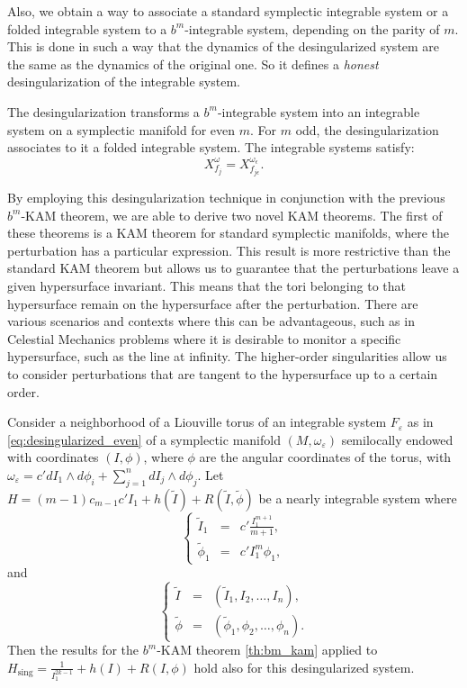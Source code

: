 Also, we obtain a way to associate a standard symplectic integrable system or a folded integrable system to a $b^m$-integrable system, depending on the parity of $m$. This is done in such a way that the dynamics of the desingularized system are the same as the dynamics of the original one. So it defines a \emph{honest} desingularization of the integrable system.

\begin{theoremC}
The desingularization transforms a $b^m$-integrable system into an integrable system  on a symplectic manifold for even $m$. For $m$ odd, the desingularization associates to it  a folded integrable system. The integrable systems satisfy:
$$X_{f_j}^\omega = X_{f_{j\epsilon}}^{\omega_\epsilon}.$$
\end{theoremC}

By employing this desingularization technique in conjunction with the previous $b^m$-KAM theorem, we are able to derive two novel KAM theorems. The first of these theorems is a KAM theorem for standard symplectic manifolds, where the perturbation has a particular expression. This result is more restrictive than the standard KAM theorem but allows us to guarantee that the perturbations leave a given hypersurface invariant. This means that the tori belonging to that hypersurface remain on the hypersurface after the perturbation. There are various scenarios and contexts where this can be advantageous, such as in Celestial Mechanics problems where it is desirable to monitor a specific hypersurface, such as the line at infinity. The higher-order singularities allow us to consider perturbations that are tangent to the hypersurface up to a certain order.

\begin{theoremD}
Consider a neighborhood of a Liouville torus of an integrable system $F_\varepsilon$ as in \ref{eq:desingularized_even} of a symplectic manifold $(M, \omega_\varepsilon)$ semilocally endowed with coordinates $(I,\phi)$, where $\phi$ are the angular coordinates of the torus, with $\omega_\varepsilon = c' dI_1 \wedge d\phi_i + \sum_{j= 1}^n dI_j\wedge d\phi_j$. Let $H=(m-1)c_{m-1}c' I_1 + h(\tilde I) + R(\tilde I,\tilde \phi)$ be a nearly integrable system where
$$
\left\{
\begin{array}{rcl}
\tilde I_1 & = & c'\frac{I_1^{m+1}}{m+1},\\
\tilde \phi_1 & = & c' I_1^m \phi_1 ,
\end{array}
\right.
$$
and
$$
\left\{
\begin{array}{rcl}
\tilde I & = & (\tilde I_1, I_2, \ldots, I_n),\\
\tilde \phi & = & (\tilde \phi_1, \phi_2, \ldots, \phi_n).
\end{array}
\right.
$$
Then the results for the $b^m$-KAM theorem \ref{th:bm_kam} applied to $H_{\text{sing}} = \frac{1}{I_1^{2k-1}} + h(I) + R(I,\phi)$ hold also for this desingularized system.
\end{theoremD}

